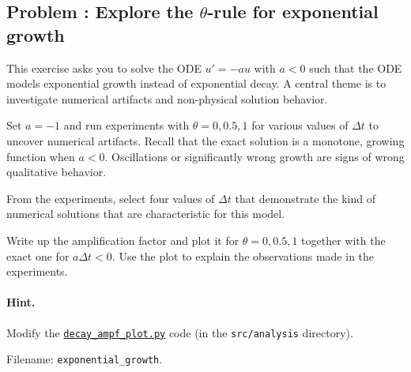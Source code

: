 \documentclass[graybox,sectrefs,envcountresetchap,open=right,final]{svmonodo}
\newenvironment{doconceexercise}{}{}
\newcounter{doconceexercisecounter}
\begin{document}
\begin{doconceexercise}

\subsection*{Problem \thedoconceexercisecounter: Explore the $\theta$-rule for exponential growth}

\label{decay:analysis:exer:growth}

This exercise asks you to solve the ODE $u'=-au$ with $a < 0$ such that
the ODE models exponential growth instead of exponential decay.  A
central theme is to investigate numerical artifacts and non-physical
solution behavior.


Set $a=-1$ and run experiments with $\theta=0, 0.5, 1$ for
various values of $\Delta t$ to uncover numerical artifacts.
Recall that the exact solution is a
monotone, growing function when $a < 0$. Oscillations or significantly
wrong growth are signs of wrong qualitative behavior.

From the experiments, select four values of $\Delta t$ that
demonstrate the kind of numerical solutions that are characteristic
for this model.



Write up the amplification factor and plot it for $\theta=0,0.5,1$
together with the exact one for $a\Delta t < 0$. Use the plot to
explain the observations made in the experiments.


\paragraph{Hint.}
Modify the \href{{http://tinyurl.com/ofkw6kc/analysis/decay_ampf_plot.py}}{\nolinkurl{decay_ampf_plot.py}} code
(in the \texttt{src/analysis} directory).




\noindent Filename: \Verb!exponential_growth!.

\end{doconceexercise}
\end{document}
